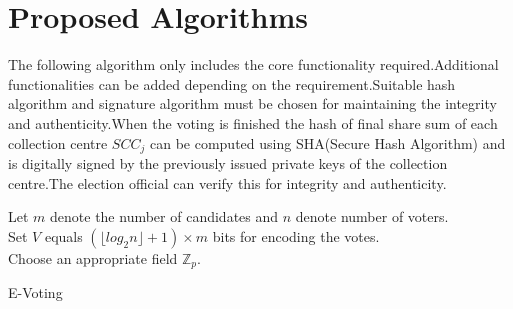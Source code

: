 \documentclass[conference]{IEEEtran}
\begin{document}
\section{Proposed Algorithms}
The following algorithm only includes the core functionality required.Additional functionalities can be added depending on the requirement.Suitable hash algorithm and signature algorithm must be chosen for maintaining the integrity and authenticity.When the voting is finished the hash of final share sum of each collection centre $SCC_j$ can be computed using SHA(Secure Hash Algorithm) \cite{pub2014draft} and is digitally signed by the previously issued private keys of the collection centre.The election official can verify this for integrity and authenticity.
\begin{algorithm}
	\begin{scriptsize}
		\BlankLine
		Let $m$ denote the number of candidates and 
		$n$ denote number of voters.\\
		Set $V$ equals $(\lfloor log_2n \rfloor+1)\times m$ bits
		for encoding the votes. \\
		Choose an appropriate field $\mathbb{Z}_p.$
	
	\caption{E-Voting}
	\label{Alg:Evt}
	\end{scriptsize}
	\end{algorithm}
	
\end{document}
